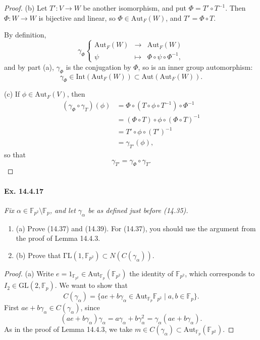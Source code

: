 \documentclass[11pt,a4paper]{article}
\newcommand{\be} {\begin{enumerate}}
\newcommand{\ee} {\end{enumerate}}
\newcommand{\F}{\mathbb{F}}
\begin{document}
{\begin{proof}
\item[(b)] Let $T' : V \to W$ be another isomorphism, and put $\Phi =T' \circ T^{-1}$. Then $\Phi : W \to W$ is bijective and linear, so $\Phi \in \mathrm{Aut}_F(W)$, and $T' = \Phi \circ T$. 

By definition,
$$
\gamma_\Phi
\left\{
\begin{array}{ccc}
\mathrm{Aut}_F(W) & \to &\mathrm{Aut}_F(W)\\
\psi  & \mapsto & \Phi \circ \psi \circ \Phi^{-1},
\end{array}
\right.
$$
and by part (a), $\gamma_\Phi$ is the conjugation by $\Phi$, so is an inner group automorphism: $$\gamma_\Phi \in \mathrm{Int}(\mathrm{Aut}_F(W)) \subset \mathrm{Aut}(\mathrm{Aut}_F(W)).$$
\item[(c)] If $\phi \in \mathrm{Aut}_F(V)$, then
\begin{align*}
(\gamma_\Phi \circ \gamma_T)(\phi) &= \Phi \circ (T \circ \phi \circ T^{-1}) \circ \Phi^{-1}\\
&= (\Phi \circ T) \circ \phi \circ (\Phi \circ T)^{-1}\\
&= T' \circ \phi \circ (T')^{-1}\\
&= \gamma_{T'}(\phi),
\end{align*}
so that
$$\gamma_{T'} = \gamma_{\Phi} \circ \gamma_T.$$
\end{proof}

\paragraph{Ex. 14.4.17}{\it Fix $\alpha \in \F_{p^2} \setminus \F_p$, and let $\gamma_\alpha$ be as defined just before (14.35).
\be
\item[(a)] Prove (14.37) and (14.39). For (14.37), you should use the argument from the proof of Lemma 14.4.3.
\item[(b)] Prove that $\mathrm{\Gamma L}(1,\F_{p^2}) \subset N(C(\gamma_\alpha))$.
\ee
}
\begin{proof}
\item[(a)] Write $e =1_{\F_{p^2}} \in \mathrm{Aut}_{\F_p}(\F_{p^2})$ the identity of $\F_{p^2}$, which corresponds to $I_2 \in \mathrm{GL}(2,\F_p)$. We want to show that
$$C(\gamma_\alpha) = \{ ae + b \gamma_\alpha \in \mathrm{Aut}_{\F_p}\F_{p^2} \mid a,b \in \F_p\}.$$
First $ae + b \gamma_\alpha \in C(\gamma_\alpha)$, since
$$ (ae + b \gamma_\alpha)\gamma_\alpha =a\gamma_\alpha + b \gamma_\alpha^2  = \gamma_\alpha(ae + b \gamma_\alpha).$$
As in the proof of Lemma 14.4.3, we take $m \in C(\gamma_\alpha)  \subset \mathrm{Aut}_{\F_p}(\F_{p^2})$.


\end{proof}}
\end{document}
